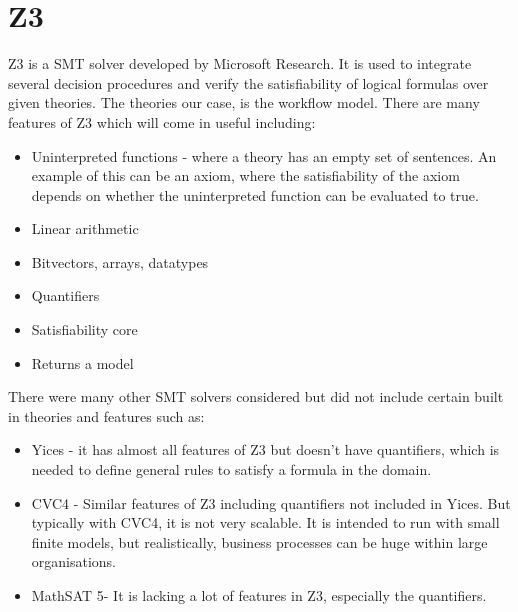 \documentclass[a4paper]{report}
\begin{document}
\section{Z3}
Z3\cite{smt} is a SMT solver developed by Microsoft Research. It is used to integrate several decision procedures and verify the satisfiability of logical formulas over given theories. The theories our case, is the workflow model. There are many features of Z3 which will come in useful including:
\begin{itemize}
\item Uninterpreted functions - where a theory has an empty set of sentences. An example of this can be an axiom, where the satisfiability of the axiom depends on whether the uninterpreted function can be evaluated to true.
\item Linear arithmetic
\item Bitvectors, arrays, datatypes
\item Quantifiers
\item Satisfiability core
\item Returns a model
\end{itemize}
There were many other SMT solvers considered but did not include certain built in theories and features such as:
\begin{itemize}
\item Yices\cite{yices} - it has almost all features of Z3 but doesn’t have quantifiers, which is needed to define general rules to satisfy a formula in the domain. 
\item CVC4\cite{cvc4} - Similar features of Z3 including quantifiers not included in Yices. But typically with CVC4, it is not very scalable. It is intended to run with small finite models, but realistically, business processes can be huge within large organisations.
\item MathSAT 5\cite{mathsat5}- It is lacking a lot of features in Z3, especially the quantifiers.
\end{itemize}
\end{document}
